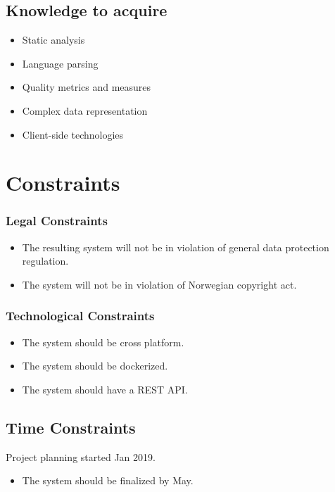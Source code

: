 \subsection{Knowledge to acquire}
\begin{itemize}
    \item Static analysis
    \item Language parsing
    \item Quality metrics and measures
    \item Complex data representation
    \item Client-side technologies  
\end{itemize}

\section{Constraints}

\subsubsection{Legal Constraints}
\begin{itemize}
    \item The resulting system will not be in violation of general data protection regulation. \cite{lovdata:gdpr}
    \item The system will not be in violation of Norwegian copyright act.
\end{itemize}

\subsubsection{Technological Constraints}
\begin{itemize}
    \item The system should be cross platform.
    \item The system should be dockerized.
    \item The system should have a REST API.
\end{itemize}

\subsection{Time Constraints}
Project planning started  Jan 2019.

\begin{itemize}
    \item The system should be finalized by  May.
\end{itemize}

